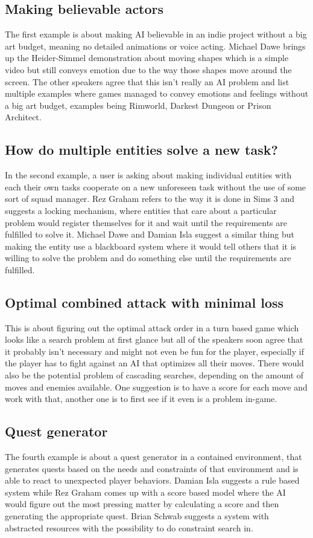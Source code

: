 \documentclass[a4paper]{article}
\begin{document}
\subsection{Making believable actors}
The first example is about making AI believable in an indie project without a big art budget, meaning no detailed animations or voice acting. Michael Dawe brings up the Heider-Simmel demonstration about moving shapes \cite{heidersimmel} which is a simple video but still conveys emotion due to the way those shapes move around the screen. The other speakers agree that this isn't really an AI problem and list multiple examples where games managed to convey emotions and feelings without a big art budget, examples being Rimworld, Darkest Dungeon or Prison Architect.

\subsection{How do multiple entities solve a new task?} \label{sec:newtask}
In the second example, a user is asking about making individual entities with each their own tasks cooperate on a new unforeseen task without the use of some sort of squad manager. Rez Graham refers to the way it is done in Sims 3 and suggests a locking mechanism, where entities that care about a particular problem would register themselves for it and wait until the requirements are fulfilled to solve it. Michael Dawe and Damian Isla suggest a similar thing but making the entity use a blackboard system where it would tell others that it is willing to solve the problem and do something else until the requirements are fulfilled.

\subsection{Optimal combined attack with minimal loss}
This is about figuring out the optimal attack order in a turn based game which looks like a search problem at first glance but all of the speakers soon agree that it probably isn't necessary and might not even be fun for the player, especially if the player has to fight against an AI that optimizes all their moves. There would also be the potential problem of cascading searches, depending on the amount of moves and enemies available. One suggestion is to have a score for each move and work with that, another one is to first see if it even is a problem in-game.

\subsection{Quest generator}
The fourth example is about a quest generator in a contained environment, that generates quests based on the needs and constraints of that environment and is able to react to unexpected player behaviors. Damian Isla suggests a rule based system while Rez Graham comes up with a score based model where the AI would figure out the most pressing matter by calculating a score and then generating the appropriate quest. Brian Schwab suggests a system with abstracted resources with the possibility to do constraint search in.
\end{document}
